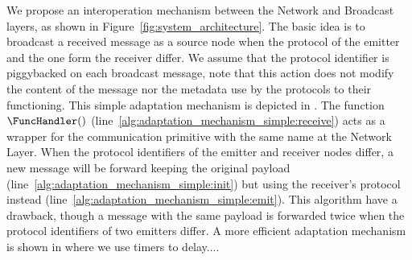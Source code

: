We propose an interoperation mechanism between the Network and Broadcast layers, as shown in Figure~\ref{fig:system_architecture}.
%
The basic idea is to broadcast a received message as a source node when the protocol of the emitter and the one form the receiver differ.
%
We assume that the protocol identifier is piggybacked on each broadcast message, note that this action does not modify the content of the message nor the metadata use by the protocols to their functioning.
%
This simple adaptation mechanism is depicted in .
%
The function $\FuncHandler()$ (line~\ref{alg:adaptation_mechanism_simple:receive}) acts as a wrapper for the communication primitive with the same name at the Network Layer.
%
When the protocol identifiers of the emitter and receiver nodes differ, a new message will be forward  keeping the original payload (line~\ref{alg:adaptation_mechanism_simple:init}) but using the receiver's protocol instead (line~\ref{alg:adaptation_mechanism_simple:emit}). This algorithm have a drawback, though a message with the same payload is forwarded twice when the protocol identifiers of two emitters differ.
%
A more efficient adaptation mechanism is shown in  where we use timers to delay....
